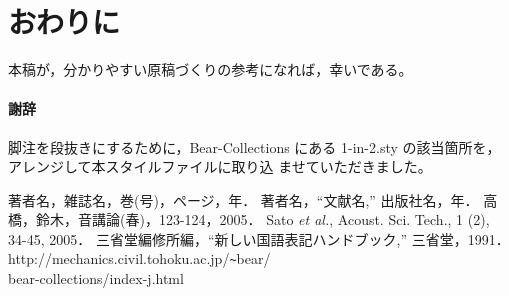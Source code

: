 \documentclass[10pt,twocolumn]{jarticle} %
\begin{document}
\section{おわりに}

本稿が，分かりやすい原稿づくりの参考になれば，幸いである。

\paragraph{謝辞}

脚注を段抜きにするために，Bear-Collections \cite{bear}
にある 1-in-2.sty の該当箇所を，アレンジして本スタイルファイルに取り込
ませていただきました。


\begin{thebibliography}{9} %
\itemsep -5pt             %
著者名，雑誌名，巻(号)，ページ，年．
著者名，``文献名,'' 出版社名，年．
高橋，鈴木，音講論(春)，123-124，2005．
Sato {\itshape et al.}, Acoust. Sci. Tech., 1 (2), 34-45, 2005．
三省堂編修所編，``新しい国語表記ハンドブック,'' 三省堂，1991．
http://mechanics.civil.tohoku.ac.jp/\verb|~|bear/\\bear-collections/index-j.html
\end{thebibliography}
\end{document}
